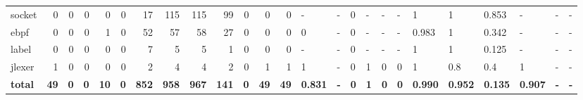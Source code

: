 \begin{table}[htp!]
\begin{adjustbox}{max width=\textwidth}
\begin{tabular}{l||rrr|rrr|rrr|rrr||lll|lll|lll|lll}
            socket           & 0                     & 0          & 0          & 0                      & 0          & 17           & 115                   & 115          & 99           & 0                      & 0           & 0           & -              & -          & 0          & -             & -          & -          & 1              & 1              & 0.853          & -              & -          & -          \\
            ebpf             & 0                     & 0          & 0          & 1                      & 0          & 52           & 57                    & 58           & 27           & 0                      & 0           & 0           & 0              & -          & 0          & -             & -          & -          & 0.983          & 1              & 0.342          & -              & -          & -          \\
            label            & 0                     & 0          & 0          & 0                      & 0          & 7            & 5                     & 5            & 1            & 0                      & 0           & 0           & -              & -          & 0          & -             & -          & -          & 1              & 1              & 0.125          & -              & -          & -          \\
            jlexer           & 1                     & 0          & 0          & 0                      & 0          & 2            & 4                     & 4            & 2            & 0                      & 1           & 1           & 1              & -          & 0          & 1             & 0          & 0          & 1              & 0.8            & 0.4            & 1              & -          & -          \\
            \hline
            \textbf{total}   & \textbf{49}           & \textbf{0} & \textbf{0} & \textbf{10}            & \textbf{0} & \textbf{852} & \textbf{958}          & \textbf{967} & \textbf{141} & \textbf{0}             & \textbf{49} & \textbf{49} & \textbf{0.831} & \textbf{-} & \textbf{0} & \textbf{1}    & \textbf{0} & \textbf{0} & \textbf{0.990} & \textbf{0.952} & \textbf{0.135} & \textbf{0.907} & \textbf{-} & \textbf{-} \\
        \end{tabular}
    \end{adjustbox}
\end{table}